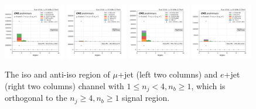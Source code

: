 \begin{figure}
    \includegraphics[width=0.24\textwidth]{chapters/Appendix/sectionQCD/figures/123j1b/mu_nBJets_True.png}
    \includegraphics[width=0.24\textwidth]{chapters/Appendix/sectionQCD/figures/123j1b/mu_nBJets_False.png}
    \includegraphics[width=0.24\textwidth]{chapters/Appendix/sectionQCD/figures/123j1b/e_nBJets_True.png}
    \includegraphics[width=0.24\textwidth]{chapters/Appendix/sectionQCD/figures/123j1b/e_nBJets_False.png}
    

    \caption{The iso and anti-iso region of $\mu$+jet (left two columns) and $e$+jet (right two columns) channel 
    with $1\leq n_j <4, n_b\geq1$, which is orthogonal to the $n_j\geq4,n_b\geq1$ signal region.
    }
    \label{fig:appendix:123j1b}
\end{figure}


